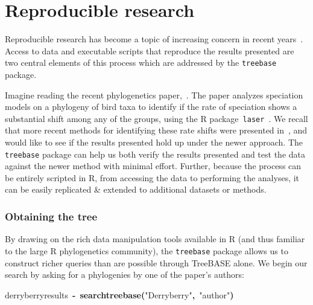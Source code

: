 \documentclass[authoryear, preprint]{elsarticle}
\makeatletter
\newcommand{\hlfunctioncall}[1]{\textcolor[rgb]{.5,0,.33}{\textbf{#1}}}%
\newcommand{\hlstring}[1]{\textcolor[rgb]{.6,.6,1}{#1}}%
\newcommand{\hlkeyword}[1]{\textbf{#1}}%
\newcommand{\hlassignement}[1]{\textbf{#1}}%
\newcommand{\hlsymbol}[1]{#1}%
\newenvironment{kframe}{%
 \def\FrameCommand##1{\hskip\@totalleftmargin \hskip-\fboxsep
 \colorbox{shadecolor}{##1}\hskip-\fboxsep
     \hskip-\linewidth \hskip-\@totalleftmargin \hskip\columnwidth}%
 \MakeFramed {\advance\hsize-\width
   \@totalleftmargin\z@ \linewidth\hsize
   \@setminipage}}%
 {\par\unskip\endMakeFramed}
\newenvironment{knitrout}{}{} %
\makeatother
\begin{document}
\section{Reproducible research}
Reproducible research has become a topic of increasing concern in recent years~\citep{Schwab2000, Gentleman2004, Peng2011b}.  
Access to data and executable scripts that reproduce the results presented 
are two central elements of this process which are addressed by the \texttt{treebase} package.   


Imagine reading the recent phylogenetics paper,~\citet{Derryberry2011}. 
The paper analyzes speciation models on a phylogeny of bird taxa to identify if the rate of speciation shows
a substantial shift among any of the groups, using the R package~\texttt{laser}~\citep{Rabosky2006b}.  
We recall that more recent methods for identifying these rate shifts were presented in~\citet{Stadler2011},
and would like to see if the results presented hold up under the newer approach.  
The \texttt{treebase} package can help us both verify the results presented and test the data against the newer method with minimal effort.  
Further, because the process can be entirely scripted in R, from accessing the data to performing the analyses,
it can be easily replicated \& extended to additional datasets or methods.  



\subsubsection*{Obtaining the tree}
By drawing on the rich data manipulation tools available in R (and thus familiar to the large R phylogenetics community),
the \texttt{treebase} package allows us to construct richer queries than are possible through TreeBASE alone.
We begin our search by asking for a phylogenies by one of the paper's authors:  

\begin{knitrout}
\color{fgcolor}\begin{kframe}
\begin{flushleft}
\ttfamily\noindent
\hlsymbol{derryberry\usebox{\hlnormalsizeboxunderscore}results}{\ }\hlassignement{\usebox{\hlnormalsizeboxlessthan}-}{\ }\hlfunctioncall{search\usebox{\hlnormalsizeboxunderscore}treebase}\hlkeyword{(}\hlstring{"{}Derryberry"{}}\hlkeyword{,}{\ }\hlstring{"{}author"{}}\hlkeyword{)}\mbox{}
\normalfont
\end{flushleft}
\end{kframe}
\end{knitrout}
\end{document}
